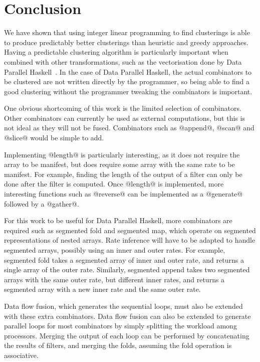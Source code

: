 

\section{Conclusion}
We have shown that using integer linear programming to find clusterings is able to produce predictably better clusterings than heuristic and greedy approaches.
Having a predictable clustering algorithm is particularly important when combined with other transformations, such as the vectorisation done by Data Parallel Haskell~\cite{chakravarty2007data}.
In the case of Data Parallel Haskell, the actual combinators to be clustered are not written directly by the programmer, so being able to find a good clustering without the programmer tweaking the combinators is important.

One obvious shortcoming of this work is the limited selection of combinators.
Other combinators can currently be used as external computations, but this is not ideal as they will not be fused.
Combinators such as @append@, @scan@ and @slice@ would be simple to add.

Implementing @length@ is particularly interesting, as it does not require the array to be manifest, but does require some array with the same rate to be manifest.
For example, finding the length of the output of a filter can only be done after the filter is computed.
Once @length@ is implemented, more interesting functions such as @reverse@ can be implemented as a @generate@ followed by a @gather@.

For this work to be useful for Data Parallel Haskell, more combinators are required such as segmented fold and segmented map, which operate on segmented representations of nested arrays.
Rate inference will have to be adapted to handle segmented arrays, possibly using an inner and outer rates.
For example, segmented fold takes a segmented array of inner and outer rate, and returns a single array of the outer rate.
Similarly, segmented append takes two segmented arrays with the same outer rate, but different inner rates, and returns a segmented array with a new inner rate and the same outer rate.

Data flow fusion, which generates the sequential loops, must also be extended with these extra combinators.
Data flow fusion can also be extended to generate parallel loops for most combinators by simply splitting the workload among processors.
Merging the output of each loop can be performed by concatenating the results of filters, and merging the folds, assuming the fold operation is associative.

